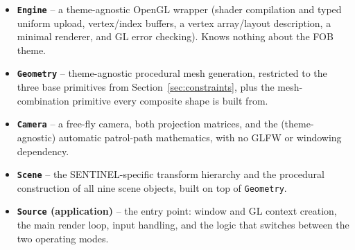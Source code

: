 \documentclass[11pt,a4paper]{article}
\begin{document}
\begin{itemize}[nosep]
  \item \textbf{\texttt{Engine}} -- a theme-agnostic OpenGL wrapper
        (shader compilation and typed uniform upload, vertex/index
        buffers, a vertex array/layout description, a minimal renderer,
        and GL error checking). Knows nothing about the FOB theme.
  \item \textbf{\texttt{Geometry}} -- theme-agnostic procedural mesh
        generation, restricted to the three base primitives from
        Section~\ref{sec:constraints}, plus the mesh-combination
        primitive every composite shape is built from.
  \item \textbf{\texttt{Camera}} -- a free-fly camera, both projection
        matrices, and the (theme-agnostic) automatic patrol-path
        mathematics, with no GLFW or windowing dependency.
  \item \textbf{\texttt{Scene}} -- the SENTINEL-specific transform
        hierarchy and the procedural construction of all nine scene
        objects, built on top of \texttt{Geometry}.
  \item \textbf{\texttt{Source} (application)} -- the entry point: window
        and GL context creation, the main render loop, input handling,
        and the logic that switches between the two operating modes.
\end{itemize}
\end{document}
